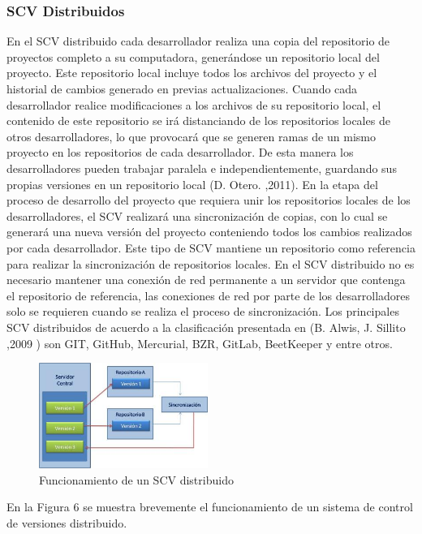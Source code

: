 \documentclass[a4paper,12pt]{article}
\begin{document}
{\subsubsection{SCV Distribuidos}
En el SCV distribuido cada desarrollador realiza una copia del repositorio de proyectos completo a su computadora, generándose un repositorio local del proyecto. Este repositorio local incluye todos los
archivos del proyecto y el historial de cambios generado en previas actualizaciones. Cuando cada
desarrollador realice modificaciones a los archivos de su repositorio local, el contenido de este repositorio se
irá distanciando de los repositorios locales de otros desarrolladores, lo que provocará que se generen
ramas de un mismo proyecto en los repositorios de cada desarrollador. De esta manera los desarrolladores pueden trabajar paralela e independientemente, guardando sus propias versiones en un repositorio local (D. Otero. ,2011). En la etapa del proceso de desarrollo del proyecto que requiera unir los repositorios locales de los desarrolladores, el SCV realizará una sincronización de copias, con lo cual se generará una nueva versión del proyecto conteniendo todos los cambios realizados por cada desarrollador. Este tipo de SCV mantiene un repositorio como referencia para realizar la sincronización de repositorios locales. En el SCV distribuido no es necesario mantener una conexión de red permanente a un servidor que contenga el repositorio de referencia, las conexiones de red por parte de los desarrolladores solo se requieren cuando se realiza el proceso de sincronización. Los principales SCV distribuidos de acuerdo a la clasificación
presentada en (B. Alwis,  J. Sillito ,2009 ) son GIT, GitHub, Mercurial, BZR, GitLab, BeetKeeper y entre otros.

\begin{figure}[h]
	\centering
	\begin{minipage}[t]{5.5cm}
		\includegraphics[width=5.5cm]{grafico3.png}	 %
		\caption{ Funcionamiento de un SCV distribuido}
	\end{minipage}
	
\end{figure}
En la Figura 6 se muestra brevemente el funcionamiento de un sistema de control de versiones distribuido.

}
\end{document}
